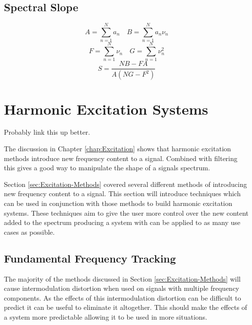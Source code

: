 	\subsection{Spectral Slope}
	\label{sec:FetureControl-Parameterisation-Flatness}

		
		\[ A = \sum_{n = 1}^{N} a_{n} \quad B = \sum_{n = 1}^{N} a_{n}\nu_{n} \]
		\[ F = \sum_{n = 1}^{N} \nu_{n} \quad G = \sum_{n = 1}^{N} \nu_{n}^{2} \]
		\begin{equation}
			S = \frac{NB - FA}
		                 {A \left( NG - F^{2} \right)}
			\label{eq:PartialSlope}
		\end{equation}

\section{Harmonic Excitation Systems}
\label{sec:FeatureControl-Systems}
	\todo
	{
		Probably link this up better.

		The discussion in Chapter \ref{chap:Excitation} shows that harmonic excitation methods introduce new
		frequency content to a signal. Combined with filtering this gives a good way to manipulate the shape of a
		signals spectrum.

	}

	Section \ref{sec:Excitation-Methods} covered several different methods of introducing new frequency content to a
	signal. This section will introduce techniques which can be used in conjunction with those methods to build
	harmonic excitation systems. These techniques aim to give the user more control over the new content added to the
	spectrum producing a system with can be applied to as many use cases as possible.

	\subsection{Fundamental Frequency Tracking}
	\label{sec:FeatureControl-Fundamental}
		The majority of the methods discussed in Section \ref{sec:Excitation-Methods} will cause intermodulation
		distortion when used on signals with multiple frequency components. As the effects of this intermodulation
		distortion can be difficult to predict it can be useful to eliminate it altogether. This should make the
		effects of a system more predictable allowing it to be used in more situations.

